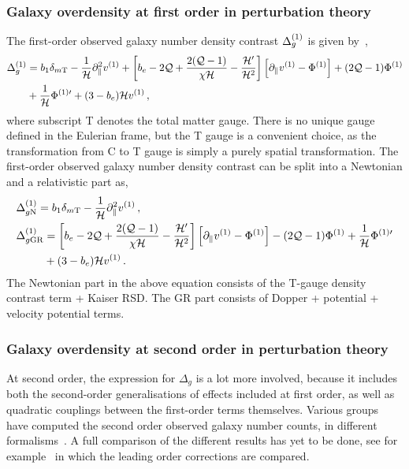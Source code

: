 \subsubsection{Galaxy overdensity at first order in perturbation theory}

The first-order observed galaxy number density contrast $\Delta_g^{(1)}$ is given by~\cite{Jolicoeur:2017eyi}, 
\begin{align}
	\Delta_g^{(1)} &= b_1 \delta_{m\mathrm{T}} - \frac{1}{\mathcal{H}} \partial_\parallel^2 v^{(1)} + \left[ b_e - 2 \mathcal{Q} + \frac{2 (\mathcal{Q} - 1)}{\chi \mathcal{H}} - \frac{\mathcal{H}'}{\mathcal{H}^2} \right] \left[ \partial_\parallel v^{(1)} - \Phi^{(1)} \right] + (2 \mathcal{Q} - 1) \Phi^{(1)} \nonumber \\
	&+ \frac{1}{\mathcal{H}} \Phi^{{(1)} \prime} + (3 - b_e) \mathcal{H} v^{(1)}\,,
\end{align}
where subscript T denotes the total matter gauge. There is no unique gauge defined in the Eulerian frame, but the T gauge is a convenient choice, as the transformation from C to T gauge is simply a purely spatial transformation. The first-order observed galaxy number density contrast can be split into a Newtonian and a relativistic part as, 
\begin{align}
	&\Delta_{g\nw}^\on = b_1 \delta_{m\mathrm{T}} - \frac{1}{\cH} \partial_\parallel^2 v^\on\,,\label{eq:DeltagNFO}\\
	&\Delta_{g\gr}^\on = \left[ b_e - 2 \Q + \frac{2 (\Q - 1)}{\chi \cH} - \frac{\cH'}{\cH^2} \right] \left[ \partial_\parallel v^\on - \Phi^\on \right] - (2 \Q - 1) \Phi^\on + \frac{1}{\cH} \Phi^{\on \prime} \nonumber \\
	& \hphantom{\Delta_{g\gr}} + (3 - b_e) \cH v^\on\,\label{eq:DeltagGRFO}.
\end{align}
The Newtonian part in the above equation consists of the T-gauge density contrast term + Kaiser RSD. The GR part consists of Dopper + potential + velocity potential terms.

\subsubsection{Galaxy overdensity at second order in perturbation theory}

At second order, the expression for $\Delta_g$ is a lot more involved, because it includes both the second-order generalisations of effects included at first order, as well as quadratic couplings between the first-order terms themselves. Various groups have computed the second order observed galaxy number counts, in different formalisms~\cite{DiDio:2014lka,Fuentes:2019nel,Bertacca:2014dra,Bertacca:2014wga,Yoo:2014sfa}. A full comparison of the different results has yet to be done, see for example~\cite{Fuentes:2020qby} in which the leading order corrections are compared.

